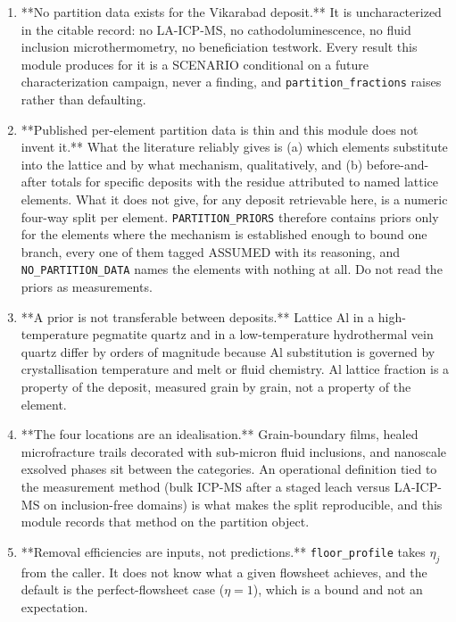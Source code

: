 \documentclass[10pt,a4paper,twoside]{report}
\begin{document}
\begin{enumerate}[leftmargin=*,label=\arabic*.]
\item **No partition data exists for the Vikarabad deposit.** It is uncharacterized in the citable record: no LA-ICP-MS, no cathodoluminescence, no fluid inclusion microthermometry, no beneficiation testwork. Every result this module produces for it is a SCENARIO conditional on a future characterization campaign, never a finding, and \texttt{partition\_fractions} raises rather than defaulting.
\item **Published per-element partition data is thin and this module does not invent it.** What the literature reliably gives is (a) which elements substitute into the lattice and by what mechanism, qualitatively, and (b) before-and-after totals for specific deposits with the residue attributed to named lattice elements. What it does not give, for any deposit retrievable here, is a numeric four-way split per element. \texttt{PARTITION\_PRIORS} therefore contains priors only for the elements where the mechanism is established enough to bound one branch, every one of them tagged ASSUMED with its reasoning, and \texttt{NO\_PARTITION\_DATA} names the elements with nothing at all. Do not read the priors as measurements.
\item **A prior is not transferable between deposits.** Lattice Al in a high-temperature pegmatite quartz and in a low-temperature hydrothermal vein quartz differ by orders of magnitude because Al substitution is governed by crystallisation temperature and melt or fluid chemistry. Al lattice fraction is a property of the deposit, measured grain by grain, not a property of the element.
\item **The four locations are an idealisation.** Grain-boundary films, healed microfracture trails decorated with sub-micron fluid inclusions, and nanoscale exsolved phases sit between the categories. An operational definition tied to the measurement method (bulk ICP-MS after a staged leach versus LA-ICP-MS on inclusion-free domains) is what makes the split reproducible, and this module records that method on the partition object.
\item **Removal efficiencies are inputs, not predictions.** \texttt{floor\_profile} takes $\eta_j$ from the caller. It does not know what a given flowsheet achieves, and the default is the perfect-flowsheet case ($\eta = 1$), which is a bound and not an expectation.

\end{enumerate}
\end{document}
